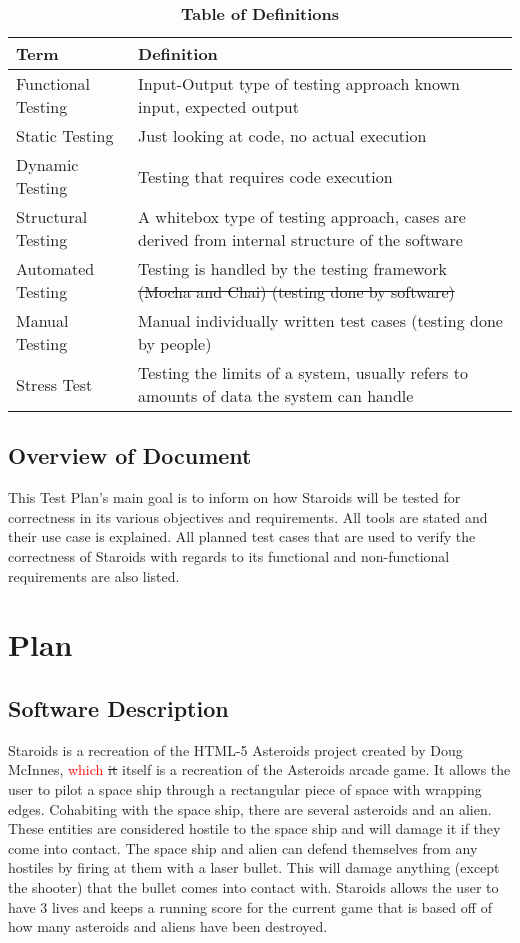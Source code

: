 \documentclass[12pt, titlepage]{article}
\begin{document}
\begin{table}[!htbp]
\caption{\textbf{Table of Definitions}} \label{Table}

\begin{tabularx}{\textwidth}{p{3cm}X}
\toprule
\textbf{Term} & \textbf{Definition}\\
\midrule
Functional Testing & Input-Output type of testing approach known input, expected output\\
Static Testing & Just looking at code, no actual execution\\
Dynamic Testing & Testing that requires code execution\\
Structural Testing & A whitebox type of testing approach, cases are derived from internal structure of the software\\
Automated Testing & Testing is handled by the testing framework \sout{(Mocha and Chai) (testing done by software)}\\
Manual Testing & Manual individually written test cases (testing done by people)\\
Stress Test & Testing the limits of a system, usually refers to amounts of data the system can handle\\
\bottomrule
\end{tabularx}

\end{table}

\subsection{Overview of Document}
This Test Plan's main goal is to inform on how Staroids will be tested for correctness in its various objectives and requirements. All tools are stated and their use case is explained. All planned test cases that are used to verify the correctness of Staroids with regards to its functional and non-functional requirements are also listed.

\section{Plan}

\subsection{Software Description}
Staroids is a recreation of the HTML-5 Asteroids project created by Doug McInnes, \textcolor{red}{which} \sout{it} itself is a recreation of the Asteroids arcade game. It allows the user to pilot a space ship through a rectangular piece of space with wrapping edges. Cohabiting with the space ship, there are several asteroids and an alien. These entities are considered hostile to the space ship and will damage it if they come into contact. The space ship and alien can defend themselves from any hostiles by firing at them with a laser bullet. This will damage anything (except the shooter) that the bullet comes into contact with. Staroids allows the user to have 3 lives and keeps a running score for the current game that is based off of how many asteroids and aliens have been destroyed.
\end{document}
